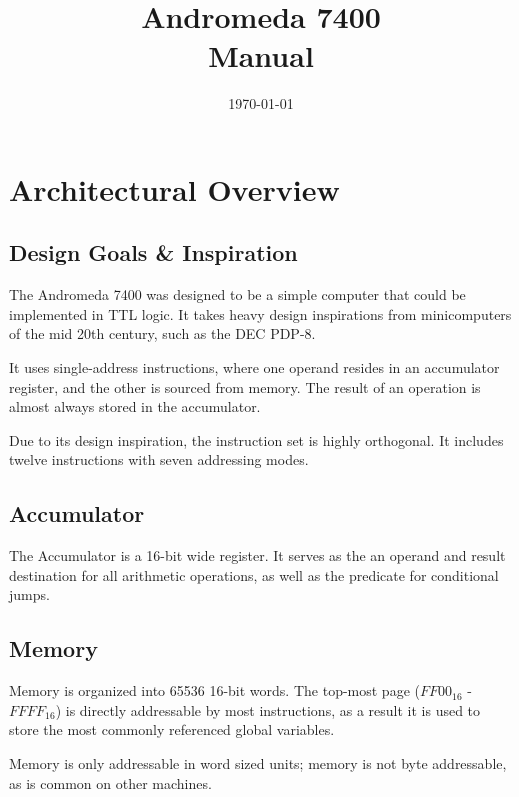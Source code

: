 \documentclass[11pt]{article}
\title{
    Andromeda 7400\\
\large Manual}
\date{\today}
\begin{document}
    \maketitle

    \pagebreak
    \tableofcontents
    \pagebreak

    \section{Architectural Overview}\label{subsec:archetctural-overview}
    \subsection{Design Goals \& Inspiration}\label{subsec:design-goals-&-inspiration}
    \par The Andromeda 7400 was designed to be a simple computer that could be implemented in TTL logic.
    It takes heavy design inspirations from minicomputers of the mid 20th century, such as the
    DEC PDP-8.
    \par It uses single-address instructions, where one operand resides in an accumulator register, and the other is
    sourced from memory.
    The result of an operation is almost always stored in the accumulator.
    \par Due to its design inspiration, the instruction set is highly orthogonal.
    It includes twelve instructions with seven addressing modes.

    \subsection{Accumulator}\label{subsec:accumulator}
    \par The Accumulator is a 16-bit wide register.
    It serves as the an operand and result destination for all arithmetic operations, as well as the predicate for conditional jumps.

    \subsection{Memory}\label{subsec:memory}
    \par Memory is organized into 65536 16-bit words.
    The top-most page ($FF00_{16}$ - $FFFF_{16}$) is directly addressable by most instructions, as a result it
    is used to store the most commonly referenced global variables.
    \par Memory is only addressable in word sized units; memory is not byte addressable, as is common on other machines.
\end{document}
